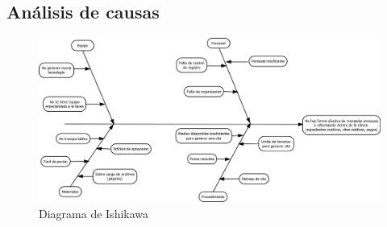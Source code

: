 \subsection{Análisis de causas}

\begin{figure}[htbp!]
		\includegraphics[width=1\textwidth]{images/ishikawa_consultas}
		\caption{Diagrama de Ishikawa}
	\end{figure}
